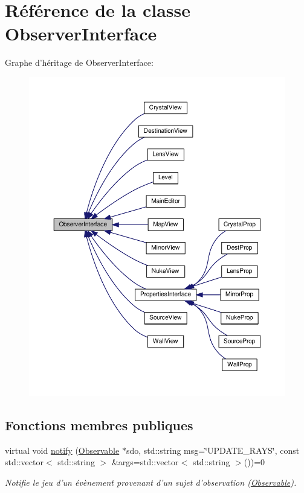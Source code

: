\hypertarget{classObserverInterface}{\section{Référence de la classe Observer\+Interface}
\label{classObserverInterface}
}


Graphe d'héritage de Observer\+Interface\+:
\nopagebreak
\begin{figure}[H]
\begin{center}
\leavevmode
\includegraphics[width=350pt]{d7/d5b/classObserverInterface__inherit__graph}
\end{center}
\end{figure}
\subsection*{Fonctions membres publiques}
\begin{DoxyCompactItemize}
\item 
virtual void \hyperlink{classObserverInterface_a1bbd22519c2942d978804714db12c8b2}{notify} (\hyperlink{classObservable}{Observable} $\ast$sdo, std\+::string msg=\char`\"{}U\+P\+D\+A\+T\+E\+\_\+\+R\+A\+Y\+S\char`\"{}, const std\+::vector$<$ std\+::string $>$ \&args=std\+::vector$<$ std\+::string $>$())=0
\begin{DoxyCompactList}\small\item\em Notifie le jeu d'un évènement provenant d'un sujet d'observation (\hyperlink{classObservable}{Observable}). \end{DoxyCompactList}\end{DoxyCompactItemize}


